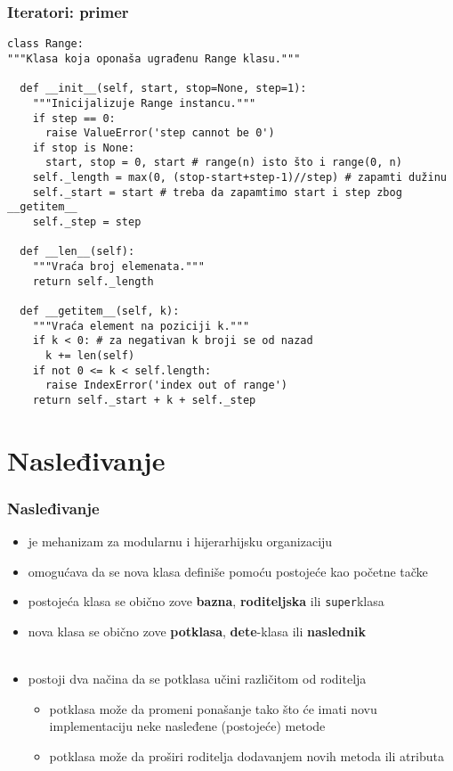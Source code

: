 \documentclass[compress,aspectratio=169]{beamer}
\begin{document}
\begin{frame}[fragile,shrink=15]
  \frametitle{Iteratori: primer}
\begin{verbatim}
class Range:
"""Klasa koja oponaša ugrađenu Range klasu."""

  def __init__(self, start, stop=None, step=1):
    """Inicijalizuje Range instancu."""
    if step == 0:
      raise ValueError('step cannot be 0')
    if stop is None:
      start, stop = 0, start # range(n) isto što i range(0, n)
    self._length = max(0, (stop-start+step-1)//step) # zapamti dužinu
    self._start = start # treba da zapamtimo start i step zbog __getitem__
    self._step = step

  def __len__(self):
    """Vraća broj elemenata."""
    return self._length

  def __getitem__(self, k):
    """Vraća element na poziciji k."""
    if k < 0: # za negativan k broji se od nazad
      k += len(self)
    if not 0 <= k < self.length:
      raise IndexError('index out of range')
    return self._start + k + self._step
\end{verbatim}
\end{frame}

\section[Nasleđivanje]{Nasleđivanje}
\begin{frame}[fragile]
  \frametitle{Nasleđivanje}
  \begin{itemize}
    \item {} je mehanizam za modularnu i hijerarhijsku organizaciju
    \item omogućava da se nova klasa definiše pomoću postojeće kao početne tačke
    \item postojeća klasa se obično zove \textbf{bazna}, \textbf{roditeljska} ili \texttt{super}klasa
    \item nova klasa se obično zove \textbf{potklasa}, \textbf{dete}-klasa ili \textbf{naslednik} \\ \ \\
    \item postoji dva načina da se potklasa učini različitom od roditelja
    \begin{itemize}
      \item potklasa može da promeni ponašanje tako što će imati novu implementaciju neke nasleđene (postojeće) metode
      \item potklasa može da proširi roditelja dodavanjem novih metoda ili atributa
    \end{itemize}
  \end{itemize}
\end{frame}
\end{document}
